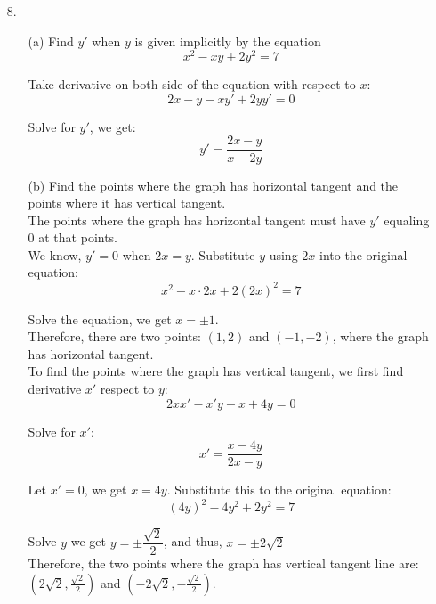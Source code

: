 \documentclass{article}
\begin{document}
\begin{enumerate}
    
    \item[8.] 
    
        \begin{enumerate}
            \item[(a)] Find $y'$ when $y$ is given implicitly by the equation $$ x^2 - xy + 2y^2 = 7 $$
            
            Take derivative on both side of the equation with respect to $x$:
            $$ 2x - y - xy' + 2yy' = 0 $$
            
            Solve for $y'$, we get:
            $$ y' = \frac{2x - y}{x - 2y} $$
            
            \item[(b)] Find the points where the graph has horizontal tangent and the points where it has vertical tangent. \\
            
            The points where the graph has horizontal tangent must have $y'$ equaling $0$ at that points.\\
            
            We know, $y'=0$ when $ 2x = y $. Substitute $y$ using $2x$ into the original equation:
            $$ x^2 - x \cdot 2x + 2(2x)^2 = 7 $$
            
            Solve the equation, we get $x = \pm 1$.\\
            
            Therefore, there are two points: $(1, 2)$ and $(-1, -2)$, where the graph has horizontal tangent. \\
            
            To find the points where the graph has vertical tangent, we first find derivative $x'$ respect to $y$:
            $$ 2xx' - x'y - x + 4y = 0 $$
            
            Solve for $x'$:
            $$ x' = \frac{x - 4y}{2x - y}$$
            
            Let $x'=0$, we get $x = 4y$. Substitute this to the original equation:
            $$ (4y)^2 - 4y^2 + 2y^2 = 7 $$
            
            Solve $y$ we get $y = \pm \dfrac{\sqrt{2}}{2}$, and thus, $x = \pm 2\sqrt{2}$ \\
            
            Therefore, the two points where the graph has vertical tangent line are: $(2\sqrt{2}, \frac{\sqrt{2}}{2})$ and $(-2\sqrt{2}, -\frac{\sqrt{2}}{2})$.
            

\end{enumerate}
\end{enumerate}
\end{document}

